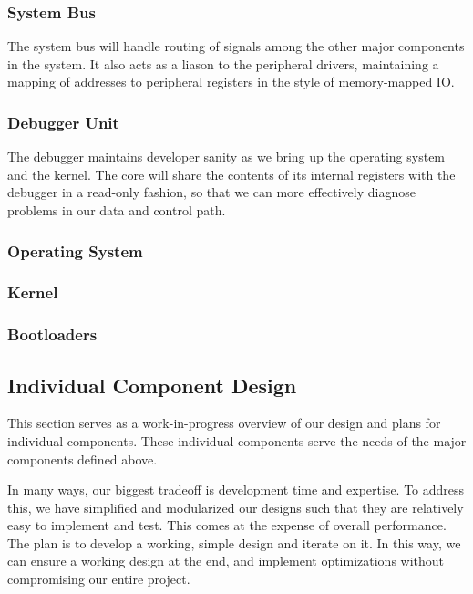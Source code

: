 \documentclass{article}
\begin{document}
    \subsubsection{System Bus}
    The system bus will handle routing of signals among the other major components in the system.  It also acts as a liason to the peripheral drivers, maintaining a mapping of addresses to peripheral registers in the style of memory-mapped IO.
    
    \subsubsection{Debugger Unit}
    The debugger maintains developer sanity as we bring up the operating system and the kernel.  The core will share the contents of its internal registers with the debugger in a read-only fashion, so that we can more effectively diagnose problems in our data and control path.
    
    \subsubsection{Operating System}

    \subsubsection{Kernel}

    \subsubsection{Bootloaders}

\subsection{Individual Component Design}
    This section serves as a work-in-progress overview of our design and plans for individual components.  These individual components serve the needs of the major components defined above.
    
    In many ways, our biggest tradeoff is development time and expertise.  To address this, we have simplified and modularized our designs such that they are relatively easy to implement and test.  This comes at the expense of overall performance.  The plan is to develop a working, simple design and iterate on it.  In this way, we can ensure a working design at the end, and implement optimizations without compromising our entire project.
    
\end{document}
